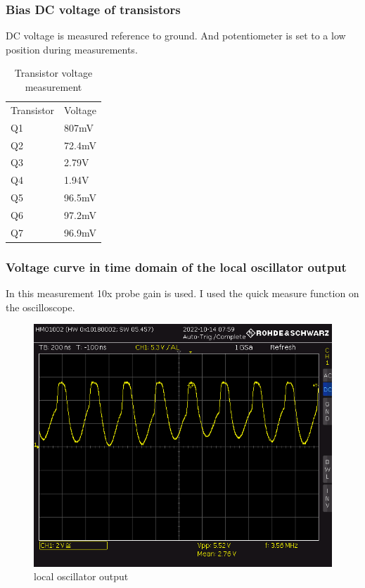 \documentclass[
11pt, %
a4paper, %
oneside, %
headinclude,footinclude, %
BCOR5mm, %
]{scrartcl}
\begin{document}
\subsubsection{Bias DC voltage of transistors}
DC voltage is measured reference to ground. And potentiometer is set to
a low position during measurements.


\begin{table}[h]\centering
    \begin{tabular}{|l|l|}
        \cline{1-2}
        Transistor & Voltage \\
        \cline{1-2}
        Q1 & 807mV \\
        Q2 & 72.4mV \\
        Q3 & 2.79V \\
        Q4 & 1.94V \\
        Q5 & 96.5mV \\
        Q6 & 97.2mV \\
        Q7 & 96.9mV \\
        \cline{1-2}
    \end{tabular}
    \caption{Transistor voltage measurement}
\end{table}

\newpage

\subsubsection{Voltage curve in time domain of the local oscillator output}
In this measurement 10x probe gain is used. I used the quick measure function
on the oscilloscope.

\begin{figure}[h!]
    \centering
    \includegraphics[width=0.9\linewidth]{Figures/BUCK06.PNG}
    \caption{local oscillator output}
    \label{fig:local oscillator output}
\end{figure}
\end{document}
